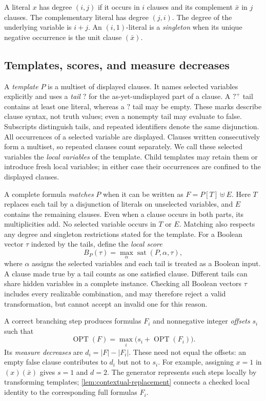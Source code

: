 \documentclass[11pt]{article}
\newcommand{\OPT}{\operatorname{OPT}}
\newcommand{\anytail}{\mathord{?}}
\newcommand{\plustail}{\mathord{?}^{+}}
\theoremstyle{definition}
\theoremstyle{remark}
\begin{document}
A literal $x$ has degree $(i,j)$ if it occurs in $i$ clauses and its complement
$\bar x$ in $j$ clauses. The complementary literal has degree $(j,i)$.
The degree of the underlying variable is $i+j$.
An $(i,1)$-literal is a \emph{singleton} when its unique
negative occurrence is the unit clause $(\bar x)$.

\subsection{Templates, scores, and measure decreases}
\label{sec:local-notation}

A \emph{template} $P$ is a multiset of displayed clauses. It names selected
variables explicitly and uses a \emph{tail} $\anytail$ for the as-yet-undisplayed
part of a clause. A $\plustail$ tail contains at least one literal, whereas a $\anytail$ tail
may be empty. These marks describe clause syntax, not truth values; even a
nonempty tail may evaluate to false. Subscripts distinguish tails, and repeated
identifiers denote the same disjunction. All occurrences of a selected
variable are displayed. Clauses written consecutively form a multiset, so
repeated clauses count separately.
We call these selected variables the \emph{local variables} of the template.
Child templates may retain them or introduce fresh local variables; in either
case their occurrences are confined to the displayed clauses.

A complete formula \emph{matches} $P$ when it can be written as
$F=P[T]\uplus E$. Here $T$ replaces each tail by a disjunction of literals
on unselected variables, and $E$ contains the remaining clauses.
Even when a clause occurs in both parts, its multiplicities add.
No selected variable occurs in $T$ or $E$. Matching also
respects any degree and singleton restrictions stated for the template.
For a Boolean vector $\tau$ indexed by the tails, define the \emph{local
score}
\begin{equation}
 B_P(\tau)=\max_{\alpha}\operatorname{sat}(P,\alpha,\tau),
 \label{eq:local-score}
\end{equation}
where $\alpha$ assigns the selected variables and each tail is treated as a
Boolean input. A clause made true by a tail counts as one satisfied clause.
Different tails can share hidden variables in a complete instance. Checking
all Boolean vectors $\tau$ includes every realizable combination, and may
therefore reject a valid transformation, but cannot accept an invalid one for
this reason.

A correct branching step produces formulas $F_i$ and nonnegative integer
\emph{offsets} $s_i$ such that
\[
  \OPT(F)=\max_i\bigl(s_i+\OPT(F_i)\bigr).
\]
Its \emph{measure decreases} are $d_i=|F|-|F_i|$. These need not equal the
offsets: an empty false clause contributes to $d_i$ but not to $s_i$.
For example, assigning $x=1$ in $(x)(\bar x)$ gives $s=1$ and $d=2$.
The generator represents such steps locally by transforming templates;
\cref{lem:contextual-replacement} connects a checked local identity to the
corresponding full formulas $F_i$.
\end{document}
